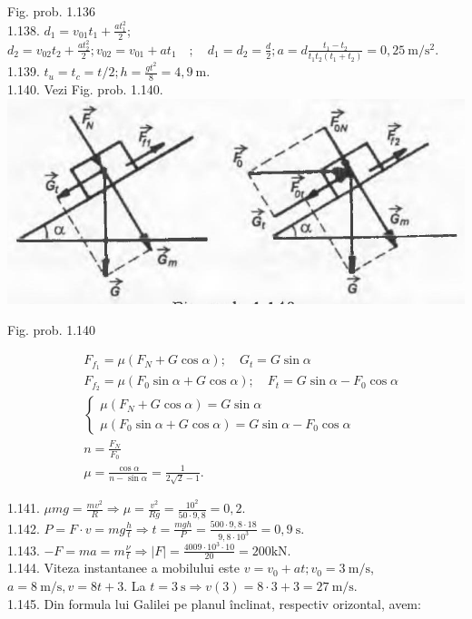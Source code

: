 \documentclass[10pt]{article}
\begin{document}
Fig. prob. 1.136\\
1.138. $d_{1}=v_{01} t_{1}+\frac{a t_{1}^{2}}{2}$; $d_{2}=v_{02} t_{2}+\frac{a t_{2}^{2}}{2} ; v_{02}=v_{01}+a t_{1} \quad ; \quad d_{1}=d_{2}=\frac{d}{2} ; a=d \frac{t_{1}-t_{2}}{t_{1} t_{2}\left(t_{1}+t_{2}\right)}=0,25 \mathrm{~m} / \mathrm{s}^{2}$.\\
1.139. $t_{u}=t_{c}=t / 2 ; h=\frac{g t^{2}}{8}=4,9 \mathrm{~m}$.\\
1.140. Vezi Fig. prob. 1.140.\\
\includegraphics[max width=\textwidth, center]{2025_07_01_5b3ff9fa0d508c8e9f17g-227}

Fig. prob. 1.140

$$
\begin{aligned}
& F_{f_{1}}=\mu\left(F_{N}+G \cos \alpha\right) ; \quad G_{t}=G \sin \alpha \\
& F_{f_{2}}=\mu\left(F_{0} \sin \alpha+G \cos \alpha\right) ; \quad F_{t}=G \sin \alpha-F_{0} \cos \alpha \\
& \left\{\begin{array}{l}
\mu\left(F_{N}+G \cos \alpha\right)=G \sin \alpha \\
\mu\left(F_{0} \sin \alpha+G \cos \alpha\right)=G \sin \alpha-F_{0} \cos \alpha
\end{array}\right. \\
& n=\frac{F_{N}}{F_{0}} \\
& \mu=\frac{\cos \alpha}{n-\sin \alpha}=\frac{1}{2 \sqrt{2}-1} .
\end{aligned}
$$

1.141. $\mu m g=\frac{m v^{2}}{R} \Rightarrow \mu=\frac{v^{2}}{R g}=\frac{10^{2}}{50 \cdot 9,8}=0,2$.\\
1.142. $P=F \cdot v=m g \frac{h}{t} \Rightarrow t=\frac{m g h}{P}=\frac{500 \cdot 9,8 \cdot 18}{9,8 \cdot 10^{3}}=0,9 \mathrm{~s}$.\\
1.143. $-F=m a=m \frac{\nu}{t} \Rightarrow|F|=\frac{4009 \cdot 10^{3} \cdot 10}{20}=200 \mathrm{kN}$.\\
1.144. Viteza instantanee a mobilului este $v=v_{0}+a t ; v_{0}=3 \mathrm{~m} / \mathrm{s}$, $a=8 \mathrm{~m} / \mathrm{s}, v=8 t+3$. La $t=3 \mathrm{~s} \Rightarrow v(3)=8 \cdot 3+3=27 \mathrm{~m} / \mathrm{s}$.\\
1.145. Din formula lui Galilei pe planul înclinat, respectiv orizontal, avem:
\end{document}
